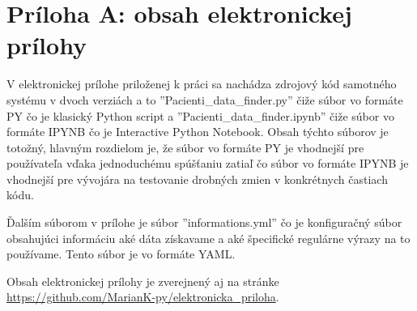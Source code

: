 \chapter*{Príloha A: obsah elektronickej prílohy}



V elektronickej prílohe priloženej k práci sa nachádza zdrojový kód samotného systému v dvoch verziách a to ''Pacienti\_data\_finder.py'' čiže súbor vo formáte PY čo je klasický Python script a ''Pacienti\_data\_finder.ipynb'' čiže súbor vo formáte IPYNB čo je Interactive Python Notebook. Obsah týchto súborov je totožný, hlavným rozdielom je, že súbor vo formáte PY je vhodnejší pre používateľa vďaka jednoduchému spúšťaniu zatiaľ čo súbor vo formáte IPYNB je vhodnejší pre vývojára na testovanie drobných zmien v konkrétnych častiach kódu.

Ďalším súborom v prílohe je súbor ''informations.yml'' čo je konfiguračný súbor obsahujúci informáciu aké dáta získavame a aké špecifické regulárne výrazy na to používame. Tento súbor je vo formáte YAML.  

Obsah elektronickej prílohy je zverejnený aj na stránke \url{https://github.com/MarianK-py/elektronicka_priloha}.